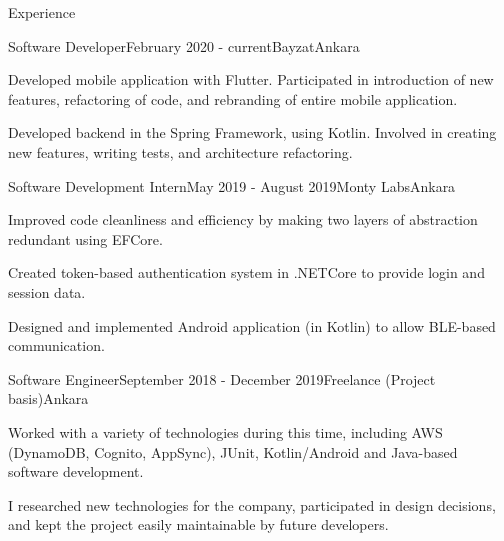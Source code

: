 \documentclass{resume} %
\begin{document}
\begin{rSection}{Experience}
    
    \begin{rSubsection}{Software Developer}{February 2020 - current}{Bayzat}{Ankara}
        \item Developed mobile application with Flutter. Participated in introduction of new features, refactoring of code, and rebranding of entire mobile application.
        
        \item Developed backend in the Spring Framework, using Kotlin. Involved in creating new features, writing tests, and architecture refactoring.
    \end{rSubsection}
    
    \begin{rSubsection}{Software Development Intern}{May 2019 - August 2019}{Monty Labs}{Ankara}
        \item Improved code cleanliness and efficiency by making two layers of abstraction redundant using EFCore.
        
        \item Created token-based authentication system in .NETCore to provide login and session data.
        
        \item Designed and implemented Android application (in Kotlin) to allow BLE-based communication.
    \end{rSubsection}
    
    \begin{rSubsection}{Software Engineer}{September 2018 - December 2019}{Freelance (Project basis)}{Ankara}
        \item Worked with a variety of technologies during this time, including AWS (DynamoDB, Cognito, AppSync), JUnit, Kotlin/Android and Java-based software development.
        
        \item I researched new technologies for the company, participated in design decisions, and kept the project easily maintainable by future developers.
    \end{rSubsection}
    
\end{rSection}

\end{document}
